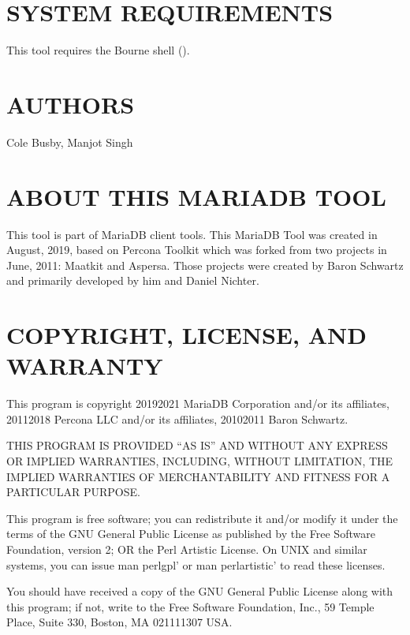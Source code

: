 \documentclass[letterpaper,10pt,english]{sphinxmanual}
\begin{document}
\section{SYSTEM REQUIREMENTS}
\label{\detokenize{mariadb-summary:system-requirements}}
This tool requires the Bourne shell ().


\section{AUTHORS}
\label{\detokenize{mariadb-summary:authors}}
Cole Busby, Manjot Singh


\section{ABOUT THIS MARIADB TOOL}
\label{\detokenize{mariadb-summary:about-this-mariadb-tool}}
This tool is part of MariaDB client tools. This MariaDB Tool was created in
August, 2019, based on Percona Toolkit which was
forked from two projects in June, 2011: Maatkit and Aspersa.  Those projects
were created by Baron Schwartz and primarily developed by him and Daniel Nichter.


\section{COPYRIGHT, LICENSE, AND WARRANTY}
\label{\detokenize{mariadb-summary:copyright-license-and-warranty}}
This program is copyright 2019\sphinxhyphen{}2021 MariaDB Corporation and/or its affiliates,
2011\sphinxhyphen{}2018 Percona LLC and/or its affiliates, 2010\sphinxhyphen{}2011 Baron Schwartz.

THIS PROGRAM IS PROVIDED “AS IS” AND WITHOUT ANY EXPRESS OR IMPLIED
WARRANTIES, INCLUDING, WITHOUT LIMITATION, THE IMPLIED WARRANTIES OF
MERCHANTABILITY AND FITNESS FOR A PARTICULAR PURPOSE.

This program is free software; you can redistribute it and/or modify it under
the terms of the GNU General Public License as published by the Free Software
Foundation, version 2; OR the Perl Artistic License.  On UNIX and similar
systems, you can issue \textasciigrave{}man perlgpl’ or \textasciigrave{}man perlartistic’ to read these
licenses.

You should have received a copy of the GNU General Public License along with
this program; if not, write to the Free Software Foundation, Inc., 59 Temple
Place, Suite 330, Boston, MA  02111\sphinxhyphen{}1307  USA.
\end{document}
